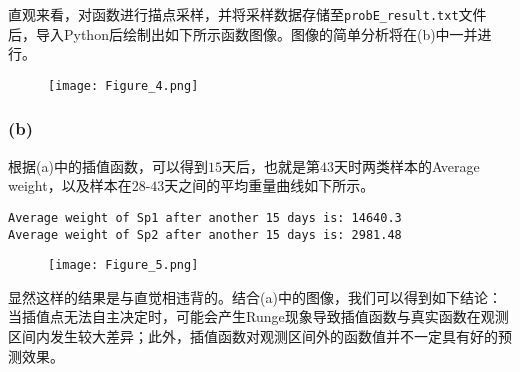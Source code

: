 \documentclass{ctexart}
\begin{document}
\begin{sloppypar}
直观来看，对函数进行描点采样，并将采样数据存储至\verb|probE_result.txt|文件后，导入Python后绘制出如下所示函数图像。图像的简单分析将在(b)中一并进行。
\begin{figure}[H]
\centering
\texttt{[image: Figure\_4.png]}
\label{Fig4}
\end{figure}

\subsubsection*{(b)}
根据(a)中的插值函数，可以得到$15$天后，也就是第$43$天时两类样本的Average weight，以及样本在$28$-$43$天之间的平均重量曲线如下所示。
\begin{shaded}
\begin{verbatim}
Average weight of Sp1 after another 15 days is: 14640.3
Average weight of Sp2 after another 15 days is: 2981.48
\end{verbatim}
\end{shaded}
\begin{figure}[H]
\centering
\texttt{[image: Figure\_5.png]}
\label{Fig5}
\end{figure}
显然这样的结果是与直觉相违背的。结合(a)中的图像，我们可以得到如下结论：当插值点无法自主决定时，可能会产生Runge现象导致插值函数与真实函数在观测区间内发生较大差异；此外，插值函数对观测区间外的函数值并不一定具有好的预测效果。

\end{sloppypar}
\end{document}
